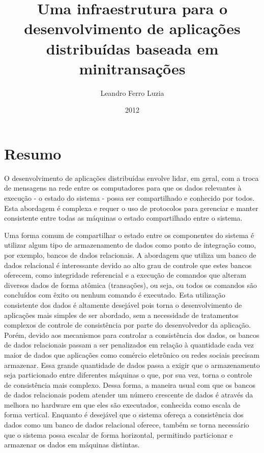 \documentclass[a4paper,12pt]{report}
\title{Uma infraestrutura para o desenvolvimento de aplicações distribuídas baseada em minitransações}
\author{Leandro Ferro Luzia}
\date{2012}
\begin{document}
\pagestyle{headings}
\maketitle
\section*{Resumo}
O desenvolvimento de aplicações distribuídas envolve lidar, em geral, com a troca de mensagens na rede entre os computadores para que os dados relevantes à execução - o estado do sistema - possa ser compartilhado e conhecido por todos. Esta abordagem é complexa e requer o uso de protocolos para gerenciar e manter consistente entre todas as máquinas o estado compartilhado entre o sistema.

Uma forma comum de compartilhar o estado entre os componentes do sistema é utilizar algum tipo de armazenamento de dados como ponto de integração como, por exemplo, bancos de dados relacionais. A abordagem que utiliza um banco de dados relacional é interessante devido ao alto grau de controle que estes bancos oferecem, como integridade referencial e a execução de comandos que alteram diversos dados de forma atômica (transações), ou seja, ou todos os comandos são concluídos com êxito ou nenhum comando é executado. Esta utilização consistente dos dados é altamente desejável pois torna o desenvolvimento de aplicações mais simples de ser abordado, sem a necessidade de tratamentos complexos de controle de consistência por parte do desenvolvedor da aplicação. Porém, devido aos mecanismos para controlar a consistência dos dados, os bancos de dados relacionais passam a ser penalizados em relação à quantidade cada vez maior de dados que aplicações como comércio eletrônico ou redes sociais precisam armazenar. Essa grande quantidade de dados passa a exigir que o armazenamento seja particionado entre diferentes máquinas o que, por sua vez, torna o controle de consistência mais complexo. Dessa forma, a maneira usual com que os bancos de dados relacionais podem atender um número crescente de dados é através da melhora no hardware em que eles são executados, conhecida como escala de forma vertical. Enquanto é desejável que o sistema ofereça a consistência dos dados como um banco de dados relacional oferece, também se torna necessário que o sistema possa escalar de forma horizontal, permitindo particionar e armazenar os dados em máquinas distintas. 
\end{document}
